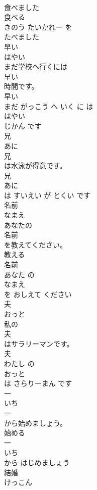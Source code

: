 \documentclass[8pt]{extreport}
\begin{document}
\begin{CJK}{UTF8}{min}
\\	食べました
\\	食べる 
\\	きのう たいかれー を 
\\	たべました
\\	早い	
\\	はやい	
\\	まだ学校へ行くには
\\	早い
\\	時間です。	
\\	早い 
\\	まだ がっこう へ いく に は 
\\	はやい
\\	じかん です	
\\	兄	
\\	あに	
\\	兄
\\	は水泳が得意です。	
\\	兄 
\\	あに
\\	は すいえい が とくい です	
\\	名前	
\\	なまえ	
\\	あなたの
\\	名前
\\	を教えてください。	
\\	教える 
\\	名前 
\\	あなた の 
\\	なまえ
\\	を おしえて ください	
\\	夫	
\\	おっと	
\\	私の
\\	夫
\\	はサラリーマンです。	
\\	夫 
\\	わたし の 
\\	おっと
\\	は さらりーまん です	
\\	一	
\\	いち	
\\	一
\\	から始めましょう。	
\\	始める 
\\	一 
\\	いち
\\	から はじめましょう	
\\	結婚	
\\	けっこん	

\end{CJK}
\end{document}
